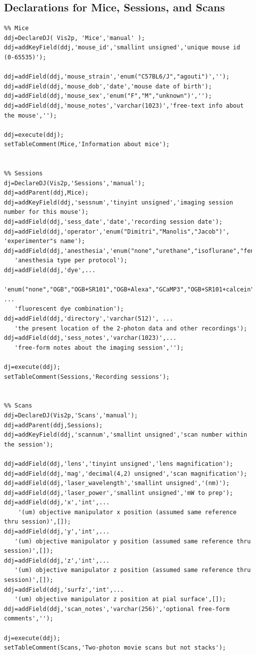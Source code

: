 \documentclass[10pt]{article}
\begin{document}
\subsection{Declarations for Mice, Sessions, and Scans}\label{sec:mice}
\begin{lstlisting}
%% Mice 
ddj=DeclareDJ( Vis2p, 'Mice','manual' );
ddj=addKeyField(ddj,'mouse_id','smallint unsigned','unique mouse id (0-65535)');

ddj=addField(ddj,'mouse_strain','enum("C57BL6/J","agouti")','');
ddj=addField(ddj,'mouse_dob','date','mouse date of birth');
ddj=addField(ddj,'mouse_sex','enum("F","M","unknown")','');
ddj=addField(ddj,'mouse_notes','varchar(1023)','free-text info about the mouse','');

ddj=execute(ddj);
setTableComment(Mice,'Information about mice');


%% Sessions
dj=DeclareDJ(Vis2p,'Sessions','manual');
ddj=addParent(ddj,Mice);
ddj=addKeyField(ddj,'sessnum','tinyint unsigned','imaging session number for this mouse');
ddj=addField(ddj,'sess_date','date','recording session date');
ddj=addField(ddj,'operator','enum("Dimitri","Manolis","Jacob")', 'experimenter"s name');
ddj=addField(ddj,'anesthesia','enum("none","urethane","isoflurane","fentanyl")',...
   'anesthesia type per protocol');
ddj=addField(ddj,'dye',...
   'enum("none","OGB","OGB+SR101","OGB+Alexa","GCaMP3","OGB+SR101+calcein")', ...
   'fluorescent dye combination');
ddj=addField(ddj,'directory','varchar(512)', ...
   'the present location of the 2-photon data and other recordings');
ddj=addField(ddj,'sess_notes','varchar(1023)',...
   'free-form notes about the imaging session','');

dj=execute(ddj);
setTableComment(Sessions,'Recording sessions');


%% Scans
ddj=DeclareDJ(Vis2p,'Scans','manual');
ddj=addParent(ddj,Sessions);
ddj=addKeyField(ddj,'scannum','smallint unsigned','scan number within the session');

ddj=addField(ddj,'lens','tinyint unsigned','lens magnification');
ddj=addField(ddj,'mag','decimal(4,2) unsigned','scan magnification');
ddj=addField(ddj,'laser_wavelength','smallint unsigned','(nm)');
ddj=addField(ddj,'laser_power','smallint unsigned','mW to prep');
ddj=addField(ddj,'x','int',...
    '(um) objective manipulator x position (assumed same reference thru session)',[]);
ddj=addField(ddj,'y','int',...
   '(um) objective manipulator y position (assumed same reference thru session)',[]);
ddj=addField(ddj,'z','int',...
   '(um) objective manipulator z position (assumed same reference thru session)',[]);
ddj=addField(ddj,'surfz','int',...
   '(um) objective manipulator z position at pial surface',[]);
ddj=addField(ddj,'scan_notes','varchar(256)','optional free-form comments','');

dj=execute(ddj);
setTableComment(Scans,'Two-photon movie scans but not stacks');
\end{lstlisting}
\end{document}
